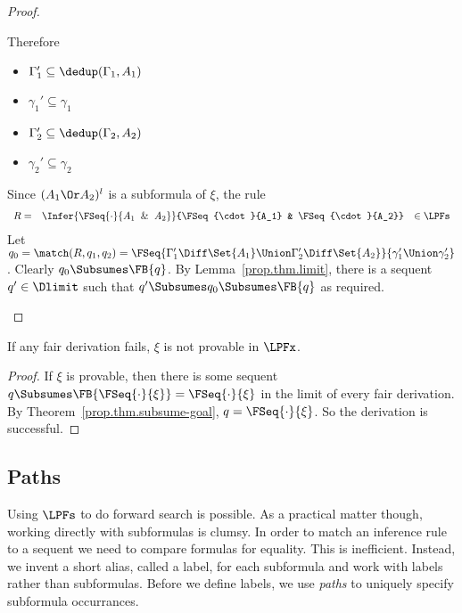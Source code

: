 \begin{proof}
\begin{description}
    Therefore

    \begin{itemize}
    \item $\Gamma_1' \subseteq \dedup(\Gamma_1,A_1)$
    \item $\gamma_1' \subseteq \gamma_1$
    \item $\Gamma_2' \subseteq \dedup(\Gamma_2,A_2)$
    \item $\gamma_2' \subseteq \gamma_2$
    \end{itemize}

    Since $(A_1\Or A_2)^l$ is a subformula of $\xi$, the rule
    \[
    \begin{array}{ccc}
      R= &
      \Infer
      {\FSeq{\cdot}{A_1\And A_2}}
      {\FSeq{\cdot}{A_1} & \FSeq{\cdot}{A_2}}
      & \in \LPFs
    \end{array}
    \]
    Let $q_0=\match(R, q_1, q_2)=\FSeq{\Gamma_1'\Diff\Set{A_1}\Union\Gamma_2'\Diff\Set{A_2}}{\gamma_1'\Union\gamma_2'}$.
    Clearly $q_0\Subsumes\FB{q}$.
    By Lemma~\ref{prop.thm.limit},
    there is a sequent $q'\in\Dlimit$ such that
    $q'\Subsumes q_0\Subsumes \FB{q}$ as required.
  \end{description}
\end{proof}

\begin{corollary}
  \label{prop.thm.inverse-complete}
  If any fair derivation fails, $\xi$ is not provable in $\LPFx$.
\end{corollary}

\begin{proof}
  If $\xi$ is provable, then there is some sequent
  $q\Subsumes\FB{\FSeq{\cdot}{\xi}}=\FSeq{\cdot}{\xi}$
  in the limit of every fair derivation.
  By Theorem~\ref{prop.thm.subsume-goal}, $q=\FSeq{\cdot}{\xi}$.
  So the derivation is successful.
\end{proof}

\subsection{Paths}

Using $\LPFs$ to do forward search is possible.  As a practical matter though,
working directly with subformulas is clumsy.  In order to match an inference
rule to a sequent we need to compare formulas for equality.  This is
inefficient.  Instead, we invent a short alias, called a label, for each
subformula and work with labels rather than subformulas.  Before we define
labels, we use \emph{paths} to uniquely specify subformula occurrances.

